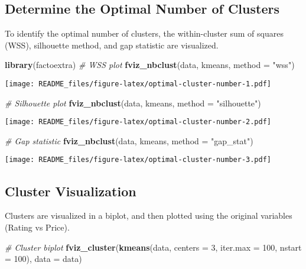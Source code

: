 \documentclass[
]{article}
\newenvironment{Shaded}{\begin{snugshade}}{\end{snugshade}}
\newcommand{\AttributeTok}[1]{\textcolor[rgb]{0.13,0.29,0.53}{#1}}
\newcommand{\CommentTok}[1]{\textcolor[rgb]{0.56,0.35,0.01}{\textit{#1}}}
\newcommand{\DecValTok}[1]{\textcolor[rgb]{0.00,0.00,0.81}{#1}}
\newcommand{\FunctionTok}[1]{\textcolor[rgb]{0.13,0.29,0.53}{\textbf{#1}}}
\newcommand{\NormalTok}[1]{#1}
\newcommand{\StringTok}[1]{\textcolor[rgb]{0.31,0.60,0.02}{#1}}
\begin{document}
\subsection{Determine the Optimal Number of
Clusters}\label{determine-the-optimal-number-of-clusters}

To identify the optimal number of clusters, the within-cluster sum of
squares (WSS), silhouette method, and gap statistic are visualized.

\begin{Shaded}
\begin{Highlighting}[]
\FunctionTok{library}\NormalTok{(factoextra)}
\CommentTok{\# WSS plot}
\FunctionTok{fviz\_nbclust}\NormalTok{(data, kmeans, }\AttributeTok{method =} \StringTok{"wss"}\NormalTok{)}
\end{Highlighting}
\end{Shaded}

\texttt{[image: README\_files/figure-latex/optimal-cluster-number-1.pdf]}

\begin{Shaded}
\begin{Highlighting}[]
\CommentTok{\# Silhouette plot}
\FunctionTok{fviz\_nbclust}\NormalTok{(data, kmeans, }\AttributeTok{method =} \StringTok{"silhouette"}\NormalTok{)}
\end{Highlighting}
\end{Shaded}

\texttt{[image: README\_files/figure-latex/optimal-cluster-number-2.pdf]}

\begin{Shaded}
\begin{Highlighting}[]
\CommentTok{\# Gap statistic}
\FunctionTok{fviz\_nbclust}\NormalTok{(data, kmeans, }\AttributeTok{method =} \StringTok{"gap\_stat"}\NormalTok{)}
\end{Highlighting}
\end{Shaded}

\texttt{[image: README\_files/figure-latex/optimal-cluster-number-3.pdf]}

\subsection{Cluster Visualization}\label{cluster-visualization}

Clusters are visualized in a biplot, and then plotted using the original
variables (Rating vs Price).

\begin{Shaded}
\begin{Highlighting}[]
\CommentTok{\# Cluster biplot}
\FunctionTok{fviz\_cluster}\NormalTok{(}\FunctionTok{kmeans}\NormalTok{(data, }\AttributeTok{centers =} \DecValTok{3}\NormalTok{, }\AttributeTok{iter.max =} \DecValTok{100}\NormalTok{, }\AttributeTok{nstart =} \DecValTok{100}\NormalTok{), }\AttributeTok{data =}\NormalTok{ data)}
\end{Highlighting}
\end{Shaded}
\end{document}
